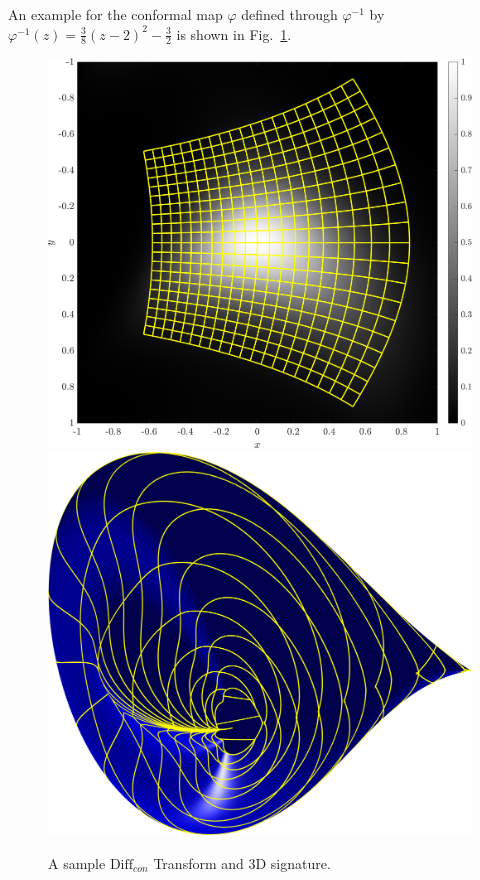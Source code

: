 \documentclass[review,onefignum,onetabnum]{siamonline190516}
\begin{document}
An example for the conformal map $\varphi$ defined through $\varphi^{-1}$ by
$\varphi^{-1}(z) = \frac{3}{8}(z - 2)^2 - \frac{3}{2}$ is shown in
Fig.~\ref{fig:Diffcon}.
\begin{figure}
\centering 
\includegraphics[width=.45\textwidth]{Figs/f_transformed_Diffcon.png}
\includegraphics[width=.45\textwidth]{Figs/Diffcon_signature.png}
\caption{A sample $\text{Diff}_{con}$ Transform and 3D signature.}
\label{fig:Diffcon}
\end{figure}



\end{document}
